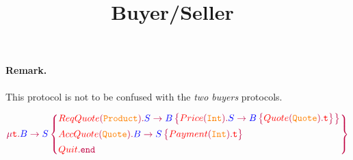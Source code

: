 \documentclass{article}
\title{Buyer/Seller~\cite{GayModular2010}}
\date{}
\begin{document}
	\maketitle

\paragraph{Remark.}
This protocol is not to be confused with the \emph{two buyers} protocols.


$$
\gtRec{t}{
\gtComm{B}{S}{
	{{ReqQuote}[Product]{
			\gtComm{S}{B}{
				{{Price}[Int]{
						\gtComm{S}{B}{
							{{Quote}[Quote]{\gtVar{t}}}
						}
				}}
			}
	}}
	{{AccQuote}[Quote]{
			\gtComm{B}{S}{
				{{Payment}[Int]{\gtVar{t}}}
			}
	}}
	{{Quit}{\gtEnd}}
}}
$$

	
	
\end{document}
